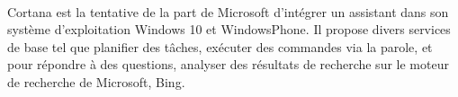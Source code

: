 \paragraph{}
Cortana est la tentative de la part de Microsoft d'intégrer un assistant dans son système d'exploitation Windows 10 et WindowsPhone. Il propose divers services de base tel que planifier des tâches, exécuter des commandes via la parole, et  pour répondre à des questions, analyser des résultats de recherche sur le moteur de recherche de Microsoft, Bing.
%


%
